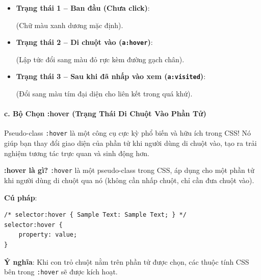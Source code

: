 \documentclass[11pt,oneside]{book}
\newcommand{\codeinline}[1]{\textcolor{accentOrange}{\texttt{#1}}}
\begin{document}
\begin{browserWindow}
\sffamily\small
\begin{itemize}[leftmargin=1.5em, itemsep=3pt, parsep=0pt]
    \item \textbf{Trạng thái 1 -- Ban đầu (Chưa click)}:
    \par\vspace{2pt}
    \quad (Chữ màu xanh dương mặc định).
    \par\vspace{4pt}
    \item \textbf{Trạng thái 2 -- Di chuột vào (\codeinline{a:hover})}:
    \par\vspace{2pt}
    \quad (Lập tức đổi sang màu đỏ rực kèm đường gạch chân).
    \par\vspace{4pt}
    \item \textbf{Trạng thái 3 -- Sau khi đã nhấp vào xem (\codeinline{a:visited})}:
    \par\vspace{2pt}
    \quad (Đổi sang màu tím đại diện cho liên kết trong quá khứ).
\end{itemize}
\end{browserWindow}

\paragraph{c. Bộ Chọn :hover (Trạng Thái Di Chuột Vào Phần Tử)}

Pseudo-class \codeinline{:hover} là một công cụ cực kỳ phổ biến và hữu ích trong CSS! Nó giúp bạn thay đổi giao diện của phần tử khi người dùng di chuột vào, tạo ra trải nghiệm tương tác trực quan và sinh động hơn.

\begin{conceptBox}
\textbf{:hover là gì?} \codeinline{:hover} là một pseudo-class trong CSS, áp dụng cho một phần tử khi người dùng di chuột qua nó (không cần nhấp chuột, chỉ cần đưa chuột vào).
\par\vspace{4pt}
\textbf{Cú pháp}:
\begin{codeWindow}
\begin{lstlisting}[language=CSS3]
/* selector:hover { Sample Text: Sample Text; } */
selector:hover {
    property: value;
}
\end{lstlisting}
\end{codeWindow}
\textbf{Ý nghĩa}: Khi con trỏ chuột nằm trên phần tử được chọn, các thuộc tính CSS bên trong \codeinline{:hover} sẽ được kích hoạt.
\end{conceptBox}
\end{document}

